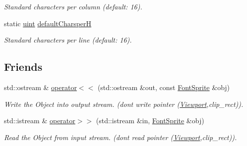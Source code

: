 \begin{DoxyCompactItemize}
\begin{DoxyCompactList}\small\item\em Standard characters per column (default: 16). \item\end{DoxyCompactList}\item 
\hypertarget{class_f2_c_1_1_font_sprite_a2f7ed6629876bb340c5b3121d0c3a2b0}{
static \hyperlink{namespace_f2_c_a58be2bac9eb3e3c99cb41b6008bf4fae}{uint} \hyperlink{class_f2_c_1_1_font_sprite_a2f7ed6629876bb340c5b3121d0c3a2b0}{defaultCharsperH}}
\label{class_f2_c_1_1_font_sprite_a2f7ed6629876bb340c5b3121d0c3a2b0}

\begin{DoxyCompactList}\small\item\em Standard characters per line (default: 16). \item\end{DoxyCompactList}\end{DoxyCompactItemize}
\subsection*{Friends}
\begin{DoxyCompactItemize}
\item 
std::ostream \& \hyperlink{class_f2_c_1_1_font_sprite_afa078a7dbc54a2dff865575cd50c1596}{operator$<$$<$} (std::ostream \&out, const \hyperlink{class_f2_c_1_1_font_sprite}{FontSprite} \&obj)
\begin{DoxyCompactList}\small\item\em Write the Object into output stream. (dont write pointer (\hyperlink{class_f2_c_1_1_viewport}{Viewport},clip\_\-rect)). \item\end{DoxyCompactList}\item 
std::istream \& \hyperlink{class_f2_c_1_1_font_sprite_abaf0f54fcd15b91ca9d1a827a477a769}{operator$>$$>$} (std::istream \&in, \hyperlink{class_f2_c_1_1_font_sprite}{FontSprite} \&obj)
\begin{DoxyCompactList}\small\item\em Read the Object from input stream. (dont read pointer (\hyperlink{class_f2_c_1_1_viewport}{Viewport},clip\_\-rect)). \item\end{DoxyCompactList}\end{DoxyCompactItemize}


